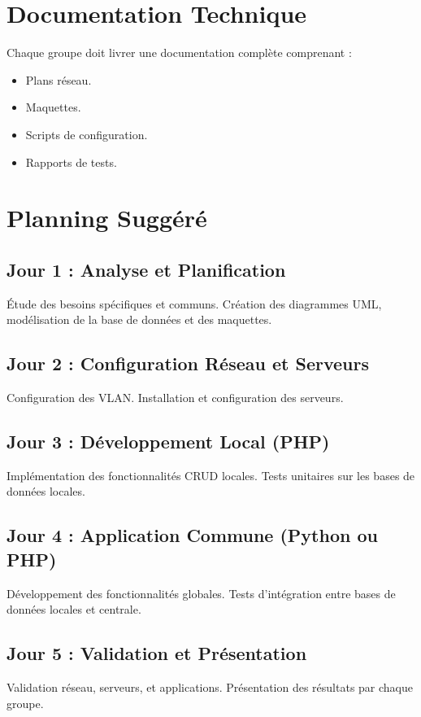 \documentclass[a4paper,12pt]{report}
\begin{document}
\chapter{Documentation Technique}
Chaque groupe doit livrer une documentation complète comprenant :
\begin{itemize}
    \item Plans réseau.
    \item Maquettes.
    \item Scripts de configuration.
    \item Rapports de tests.
\end{itemize}

\chapter{Planning Suggéré}
\section{Jour 1 : Analyse et Planification}
Étude des besoins spécifiques et communs. Création des diagrammes UML, modélisation de la base de données et des maquettes.

\section{Jour 2 : Configuration Réseau et Serveurs}
Configuration des VLAN. Installation et configuration des serveurs.

\section{Jour 3 : Développement Local (PHP)}
Implémentation des fonctionnalités CRUD locales. Tests unitaires sur les bases de données locales.

\section{Jour 4 : Application Commune (Python ou PHP)}
Développement des fonctionnalités globales. Tests d'intégration entre bases de données locales et centrale.

\section{Jour 5 : Validation et Présentation}
Validation réseau, serveurs, et applications. Présentation des résultats par chaque groupe.
\end{document}
